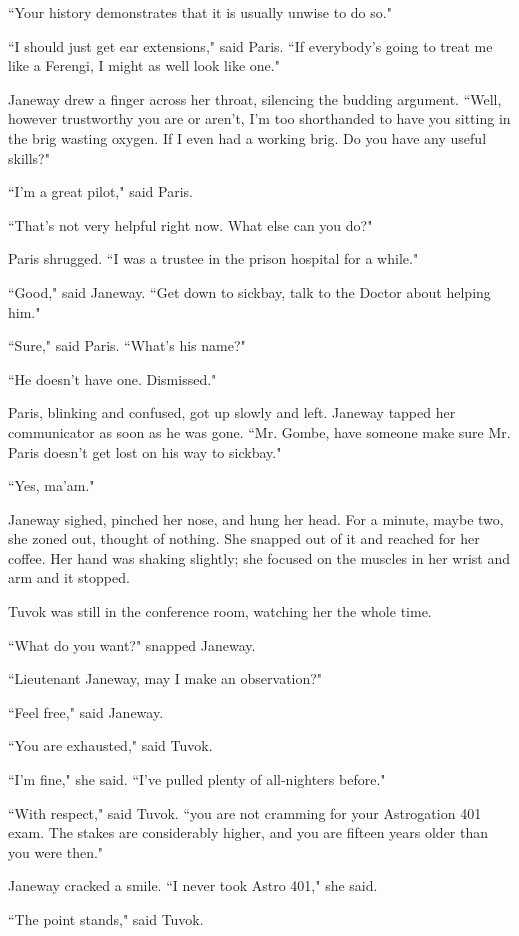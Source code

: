 \documentclass[twoside,letterpaper,12pt]{memoir}
\begin{document}
``Your history demonstrates that it is usually unwise to do so."

``I should just get ear extensions," said Paris. ``If everybody's going to treat me like a Ferengi, I might as well look like one."

Janeway drew a finger across her throat, silencing the budding argument. ``Well, however trustworthy you are or aren't, I'm too shorthanded to have you sitting in the brig wasting oxygen. If I even had a working brig. Do you have any useful skills?"

``I'm a great pilot," said Paris.

``That's not very helpful right now. What else can you do?"

Paris shrugged. ``I was a trustee in the prison hospital for a while."

``Good," said Janeway. ``Get down to sickbay, talk to the Doctor about helping him."

``Sure," said Paris. ``What's his name?"

``He doesn't have one. Dismissed."

Paris, blinking and confused, got up slowly and left. Janeway tapped her communicator as soon as he was gone. ``Mr. Gombe, have someone make sure Mr. Paris doesn't get lost on his way to sickbay."

``Yes, ma'am."

Janeway sighed, pinched her nose, and hung her head. For a minute, maybe two, she zoned out, thought of nothing. She snapped out of it and reached for her coffee. Her hand was shaking slightly; she focused on the muscles in her wrist and arm and it stopped.

Tuvok was still in the conference room, watching her the whole time.

``What do you want?" snapped Janeway.

``Lieutenant Janeway, may I make an observation?"

``Feel free," said Janeway.

``You are exhausted," said Tuvok.

``I'm fine," she said. ``I've pulled plenty of all-nighters before."

``With respect," said Tuvok. ``you are not cramming for your Astrogation 401 exam. The stakes are considerably higher, and you are fifteen years older than you were then."

Janeway cracked a smile. ``I never took Astro 401," she said.

``The point stands," said Tuvok.
\end{document}
